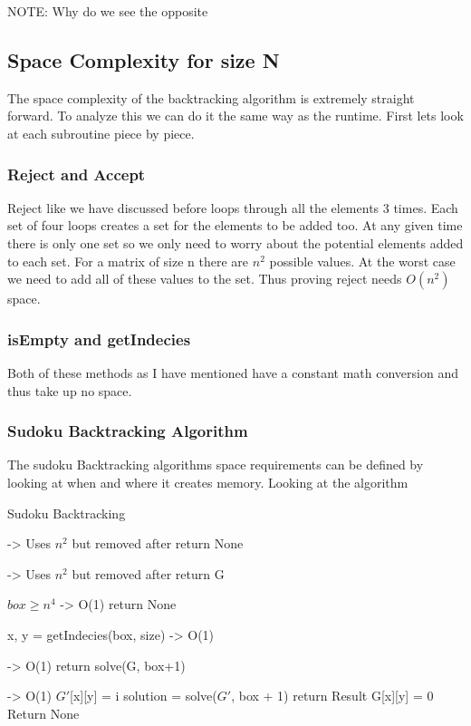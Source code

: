 \documentclass{sig-alternate}
\begin{document}

NOTE: Why do we see the opposite

\subsection{Space Complexity for size N}
The space complexity of the backtracking algorithm is extremely straight forward. To analyze this we can do it the same way as the runtime. First lets look at each subroutine piece by piece. 

\subsubsection{Reject and Accept}
Reject like we have discussed before loops through all the elements 3 times. Each set of four loops creates a set for the elements to be added too. At any given time there is only one set so we only need to worry about the potential elements added to each set. For a matrix of size n there are $n^2$ possible values. At the worst case we need to add all of these values to the set. Thus proving reject needs $O(n^2)$ space. 

\subsubsection{isEmpty and getIndecies}
Both of these methods as I have mentioned have a constant math conversion and thus take up no space. 

\subsubsection{Sudoku Backtracking Algorithm}
The sudoku Backtracking algorithms space requirements can be defined by looking at when and where it creates memory. Looking at the algorithm 

\begin{algorithm}
\caption{Sudoku Backtracking}\label{solve}
\begin{algorithmic}[1]

 -> Uses $n^2$ but removed after
\State return None
\EndIf

 -> Uses $n^2$ but removed after
\State return G
\EndIf

\If $box \ge n^4$  -> O(1)
\State return None
\EndIf

\State x, y = getIndecies(box, size) -> O(1)

  -> O(1)
\State return solve(G, box+1) 
\EndIf

 -> O(1)
\State $G'$[x][y] = i
\State solution = solve($G'$, box + 1)
\State return Result
\EndIf
\EndFor
\State G[x][y] = 0
\State Return None
\EndProcedure
\end{algorithmic}
\end{algorithm}
\end{document}
